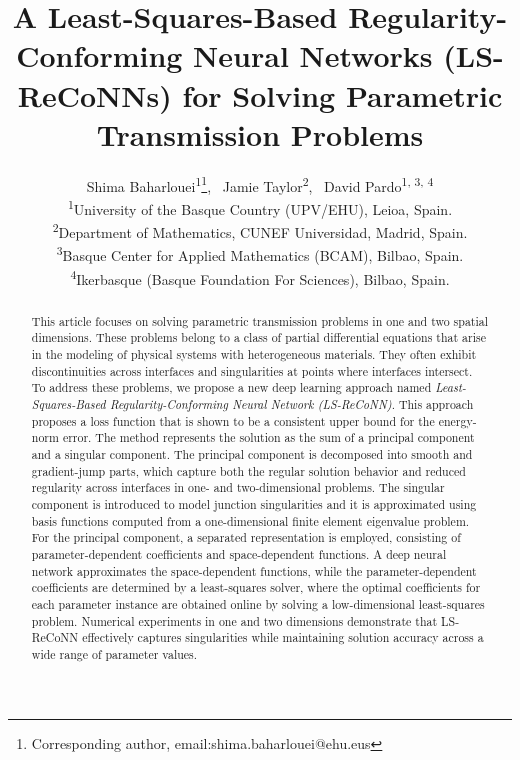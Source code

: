 \documentclass[oneside]{article}
\newcounter{reviewer}
\newcounter{point}[reviewer]
\begin{document}
\title{\bf{A Least-Squares-Based Regularity-Conforming Neural Networks (LS-ReCoNNs) for Solving Parametric Transmission Problems
}}

\author{Shima Baharlouei\textsuperscript{1}\thanks{Corresponding author, email:shima.baharlouei@ehu.eus}\hspace{0.2cm},
~Jamie Taylor\textsuperscript{2},
~David Pardo\textsuperscript{1, 3, 4}\\%

\textsuperscript{1}{\small{University of the Basque Country (UPV/EHU), Leioa, Spain.}}\\%
\textsuperscript{2}{\small{Department of Mathematics, CUNEF Universidad, Madrid, Spain.}}\\%
\textsuperscript{3}{\small{Basque Center for Applied Mathematics (BCAM),  Bilbao, Spain.}}\\%
\textsuperscript{4}{\small{Ikerbasque (Basque Foundation For Sciences), Bilbao, Spain.}}}%
\date{}
\maketitle
\begin{abstract}


This article focuses on solving parametric transmission problems in one and two spatial dimensions. These problems belong to a class of partial differential equations that arise in the modeling of physical systems with heterogeneous materials. They often exhibit discontinuities across interfaces and singularities at points where interfaces intersect. To address these problems, we propose a new deep learning approach named {\it{Least-Squares-Based Regularity-Conforming Neural Network (LS-ReCoNN)}}. This approach proposes a loss function that is shown to be a consistent upper bound for the energy-norm error. The method represents the solution as the sum of a principal component and a singular component. The principal component is decomposed into smooth and gradient-jump parts, which capture both the regular solution behavior and reduced regularity across interfaces in one- and two-dimensional problems. The singular component is introduced to model junction singularities and it is approximated using basis functions computed from a one-dimensional finite element eigenvalue problem. For the principal component, a separated representation is employed, consisting of parameter-dependent coefficients and space-dependent functions. A deep neural network approximates the space-dependent functions, while the parameter-dependent coefficients are determined by a least-squares solver, where the optimal coefficients for each parameter instance are obtained online by solving a low-dimensional least-squares problem. Numerical experiments in one and two dimensions demonstrate that LS-ReCoNN effectively captures singularities while maintaining solution accuracy across a wide range of parameter values.







 

\end{abstract}
\end{document}
